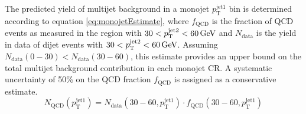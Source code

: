 The predicted yield of multijet background in a monojet $p_{\mathrm{T}}^{\mathrm{jet1}}$ bin is determined according to equation \ref{eq:monojetEstimate}, where $f_{\mathrm{QCD}}$ is the fraction of QCD events as measured in the region with $30 < p_{\mathrm{T}}^{\mathrm{jet2}} < 60 \,\text{Ge\hspace{-.08em}V}$ and $N_{\mathrm{data}}$ is the yield in data of dijet events with $30 < p_{\mathrm{T}}^{\mathrm{jet2}} < 60 \,\text{Ge\hspace{-.08em}V}$. Assuming $N_{\mathrm{data}}(0-30) < N_{\mathrm{data}}(30-60)$, this estimate provides an upper bound on the total multijet background contribution in each monojet CR. A systematic uncertainty of 50\% on the QCD fraction $f_{\mathrm{QCD}}$ is assigned as a conservative estimate.
\begin{equation}
	N_{\mathrm{QCD}}(p_{\mathrm{T}}^{\mathrm{jet1}}) = N_{\mathrm{data}}(30-60,p_{\mathrm{T}}^{\mathrm{jet1}}) \cdot f_{\mathrm{QCD}}(30-60,p_{\mathrm{T}}^{\mathrm{jet1}})
	\label{eq:monojetEstimate}
\end{equation}


